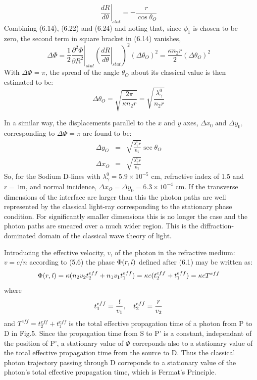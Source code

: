 \documentclass [12pt]{article}
\begin{document}
{\begin{equation}
   \left. \frac{d R}{d \theta}\right|_{stat} = -\frac{r}{ \cos  \theta_O}
 \end{equation}
  Combining (6.14), (6.22) and (6.24) and noting that, since $\phi_1$ is chosen to be zero,
  the second term in square bracket in (6.14) vanishes,
    \begin{equation}
  \left. \Delta \Phi = \frac{1}{2} \frac{\partial^2 \Phi}{\partial R^2}\right|_{stat}
   \left.\left(\frac{d  R}{d \theta}\right|_{stat}\right)^2 (\Delta \theta_O)^2
   = \frac{\kappa n_2 r}{2} (\Delta \theta_O)^2
 \end{equation}
 With $\Delta \Phi = \pi$, the spread of the angle $\theta_O$ about its classical value 
   is then estimated to be:  
   \begin{equation} 
  \Delta \theta_O = \sqrt{\frac{2 \pi}{\kappa n_2 r}} = \sqrt{\frac{\lambda_{\gamma}^0}{n_2 r}}
 \end{equation}
\par In a similar way, the displacements parallel to the $x$ and $y$ axes, 
  $\Delta x_0$  and $\Delta y_0$, corresponding
 to $\Delta \Phi = \pi$ are found to be:
  \begin{eqnarray} 
  \Delta y_O & = &  \sqrt{\frac{\lambda_{\gamma}^0 r}{n_2}} \sec \theta_O \\
   \Delta x_O & = &  \sqrt{\frac{\lambda_{\gamma}^0 r}{n_2}}  
 \end{eqnarray}
  So, for the Sodium D-lines with $\lambda_{\gamma}^0 =5.9\times10^{-5}$ cm,
  refractive index of 1.5 and $r = 1$m, and normal incidence,
   $\Delta x_O =   \Delta y_0 = 6.3 \times 10^{-4}$ cm. If the transverse dimensions
 of the interface are larger than this the photon paths are well represented by
  the classical light-ray corresponding to the stationary phase condition. 
 For significantly smaller dimensions this is no longer the case and the photon paths
  are smeared over a much wider region. This is the diffraction-dominated domain of the classical
  wave theory of light.
   \par Introducing the effective velocity, $v$, of the photon in the refractive medium: $v = c/n$ according
 to (5.6) the phase $\Phi(r,{\it l})$ defined after (6.1) may be written as:
  \begin{equation}
   \Phi(r,{\it l}) = \kappa(n_2 v_2 t_2^{eff}+n_1 v_1 t_1^{eff}) =  \kappa c (t_2^{eff}+t_1^{eff})
    =  \kappa c T^{eff}
 \end{equation}
   where 
  \[ t_1^{eff} = \frac{{\it l}}{v_1},~~~t_2^{eff} = \frac{r}{v_2} \]
  and $ T^{eff} = t_2^{eff}+t_1^{eff}$ is the total effective propagation time of a photon from P to D in Fig.5.
   Since the
  propagation time from S to P' is a constant, independant of the position of P', a stationary value
   of $\Phi$ correponds  also to a stationary value of the total effective propagation time from the source to
   D. Thus the classical photon trajectory passing through D correponds to a stationary value of the
   photon's total effective propagation time, which is Fermat's Principle.


}
\end{document}
